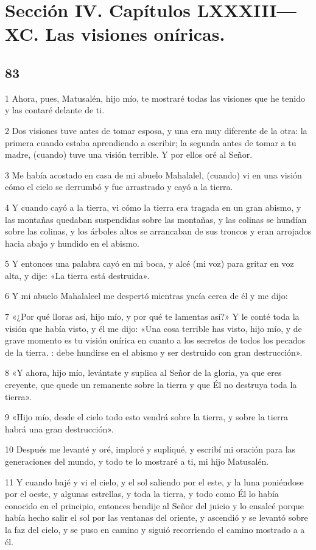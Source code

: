 \part{Sección IV. Capítulos LXXXIII—XC. Las visiones oníricas.}

\chapter{83}

\par 1 Ahora, pues, Matusalén, hijo mío, te mostraré todas las visiones que he tenido y las contaré delante de ti.
\par 2 Dos visiones tuve antes de tomar esposa, y una era muy diferente de la otra: la primera cuando estaba aprendiendo a escribir; la segunda antes de tomar a tu madre, (cuando) tuve una visión terrible. Y por ellos oré al Señor.
\par 3 Me había acostado en casa de mi abuelo Mahalalel, (cuando) vi en una visión cómo el cielo se derrumbó y fue arrastrado y cayó a la tierra.
\par 4 Y cuando cayó a la tierra, vi cómo la tierra era tragada en un gran abismo, y las montañas quedaban suspendidas sobre las montañas, y las colinas se hundían sobre las colinas, y los árboles altos se arrancaban de sus troncos y eran arrojados hacia abajo y hundido en el abismo.
\par 5 Y entonces una palabra cayó en mi boca, y alcé (mi voz) para gritar en voz alta, y dije: «La tierra está destruida».
\par 6 Y mi abuelo Mahalaleel me despertó mientras yacía cerca de él y me dijo:
\par 7 «¿Por qué lloras así, hijo mío, y por qué te lamentas así?» Y le conté toda la visión que había visto, y él me dijo: «Una cosa terrible has visto, hijo mío, y de grave momento es tu visión onírica en cuanto a los secretos de todos los pecados de la tierra. : debe hundirse en el abismo y ser destruido con gran destrucción».
\par 8 «Y ahora, hijo mío, levántate y suplica al Señor de la gloria, ya que eres creyente, que quede un remanente sobre la tierra y que Él no destruya toda la tierra».
\par 9 «Hijo mío, desde el cielo todo esto vendrá sobre la tierra, y sobre la tierra habrá una gran destrucción».
\par 10 Después me levanté y oré, imploré y supliqué, y escribí mi oración para las generaciones del mundo, y todo te lo mostraré a ti, mi hijo Matusalén.
\par 11 Y cuando bajé y vi el cielo, y el sol saliendo por el este, y la luna poniéndose por el oeste, y algunas estrellas, y toda la tierra, y todo como Él lo había conocido en el principio, entonces bendije al Señor del juicio y lo ensalcé porque había hecho salir el sol por las ventanas del oriente, y ascendió y se levantó sobre la faz del cielo, y se puso en camino y siguió recorriendo el camino mostrado a a él.

